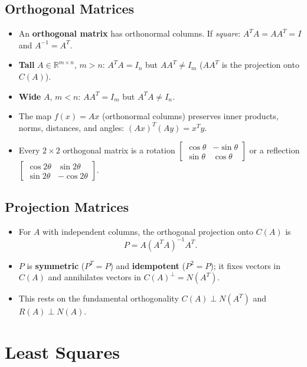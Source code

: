 \documentclass[hidelinks]{article}
\begin{document}
\subsection{Orthogonal Matrices}
\begin{itemize}
    \item An \textbf{orthogonal matrix} has orthonormal columns. If \emph{square}: $A^TA = AA^T = I$ and $A^{-1} = A^T$.
    \item \textbf{Tall} $A\in\mathbb{R}^{m\times n}$, $m>n$: $A^TA = I_n$ but $AA^T\neq I_m$ ($AA^T$ is the projection onto $C(A)$).
    \item \textbf{Wide} $A$, $m<n$: $AA^T = I_m$ but $A^TA\neq I_n$.
    \item The map $f(x)=Ax$ (orthonormal columns) preserves inner products, norms, distances, and angles: $(Ax)^T(Ay) = x^Ty$.
    \item Every $2\times 2$ orthogonal matrix is a rotation $\begin{bmatrix}\cos\theta & -\sin\theta\\ \sin\theta&\cos\theta\end{bmatrix}$ or a reflection $\begin{bmatrix}\cos 2\theta & \sin 2\theta\\ \sin 2\theta & -\cos 2\theta\end{bmatrix}$.
\end{itemize}

\subsection{Projection Matrices}
\begin{itemize}
    \item For $A$ with independent columns, the orthogonal projection onto $C(A)$ is
    \[
        P = A(A^TA)^{-1}A^T.
    \]
    \item $P$ is \textbf{symmetric} ($P^T = P$) and \textbf{idempotent} ($P^2 = P$); it fixes vectors in $C(A)$ and annihilates vectors in $C(A)^\perp = N(A^T)$.
    \item This rests on the fundamental orthogonality $C(A)\perp N(A^T)$ and $R(A)\perp N(A)$.
\end{itemize}

\section{Least Squares}
\end{document}
